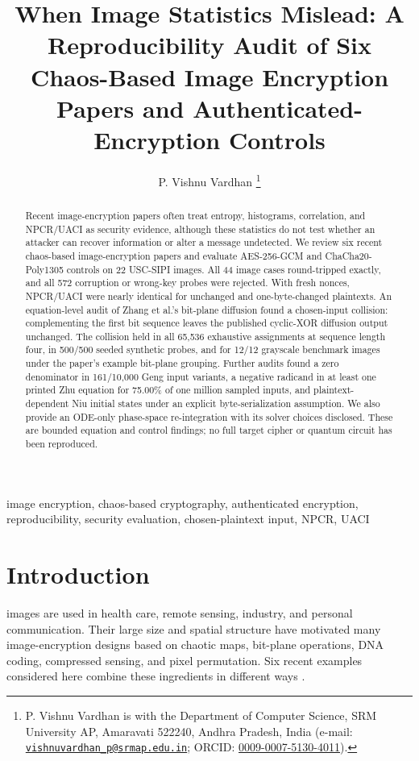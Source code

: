 \documentclass[letterpaper,journal]{IEEEtran}
\title{When Image Statistics Mislead: A Reproducibility Audit of Six Chaos-Based Image Encryption Papers and Authenticated-Encryption Controls}
\author{P. Vishnu Vardhan%
\thanks{P. Vishnu Vardhan is with the Department of Computer Science, SRM University AP, Amaravati 522240, Andhra Pradesh, India (e-mail: \href{mailto:vishnuvardhan_p@srmap.edu.in}{\texttt{vishnuvardhan\_p@srmap.edu.in}}; ORCID: \href{https://orcid.org/0009-0007-5130-4011}{0009-0007-5130-4011}).}}
\begin{document}
\maketitle

\begin{abstract}
Recent image-encryption papers often treat entropy, histograms, correlation, and NPCR/UACI as security evidence, although these statistics do not test whether an attacker can recover information or alter a message undetected. We review six recent chaos-based image-encryption papers and evaluate AES-256-GCM and ChaCha20-Poly1305 controls on 22 USC-SIPI images. All 44 image cases round-tripped exactly, and all 572 corruption or wrong-key probes were rejected. With fresh nonces, NPCR/UACI were nearly identical for unchanged and one-byte-changed plaintexts. An equation-level audit of Zhang et al.'s bit-plane diffusion found a chosen-input collision: complementing the first bit sequence leaves the published cyclic-XOR diffusion output unchanged. The collision held in all 65,536 exhaustive assignments at sequence length four, in 500/500 seeded synthetic probes, and for 12/12 grayscale benchmark images under the paper's example bit-plane grouping. Further audits found a zero denominator in 161/10,000 Geng input variants, a negative radicand in at least one printed Zhu equation for 75.00\% of one million sampled inputs, and plaintext-dependent Niu initial states under an explicit byte-serialization assumption. We also provide an ODE-only phase-space re-integration with its solver choices disclosed. These are bounded equation and control findings; no full target cipher or quantum circuit has been reproduced.\end{abstract}

\begin{IEEEkeywords}
image encryption, chaos-based cryptography, authenticated encryption, reproducibility, security evaluation, chosen-plaintext input, NPCR, UACI
\end{IEEEkeywords}

\section{Introduction}
 images are used in health care, remote sensing, industry, and personal communication. Their large size and spatial structure have motivated many image-encryption designs based on chaotic maps, bit-plane operations, DNA coding, compressed sensing, and pixel permutation. Six recent examples considered here combine these ingredients in different ways \cite{niu2024,zhang2024,zhu2024,yan2025,geng2025,aldayel2025}.
\end{document}
